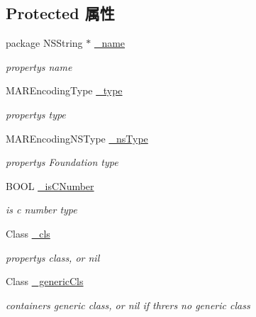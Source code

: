 \subsection*{Protected 属性}
\begin{DoxyCompactItemize}
\item 
package N\+S\+String $\ast$ \hyperlink{interface___m_a_r_model_property_meta_a4ef06b9ccb8efbf3795ec3398fba62ca}{\+\_\+name}
\begin{DoxyCompactList}\small\item\em property\textquotesingle{}s name \end{DoxyCompactList}\item 
M\+A\+R\+Encoding\+Type \hyperlink{interface___m_a_r_model_property_meta_aa15f92eb57f1786ae86186e09105a63b}{\+\_\+type}
\begin{DoxyCompactList}\small\item\em property\textquotesingle{}s type \end{DoxyCompactList}\item 
M\+A\+R\+Encoding\+N\+S\+Type \hyperlink{interface___m_a_r_model_property_meta_ab35b89e2e710e8b17714d708f60860f6}{\+\_\+ns\+Type}
\begin{DoxyCompactList}\small\item\em property\textquotesingle{}s Foundation type \end{DoxyCompactList}\item 
B\+O\+OL \hyperlink{interface___m_a_r_model_property_meta_affcc73f9311185f293b8b693d685aec0}{\+\_\+is\+C\+Number}
\begin{DoxyCompactList}\small\item\em is c number type \end{DoxyCompactList}\item 
Class \hyperlink{interface___m_a_r_model_property_meta_a6d3692d93d3afa41bf9e2a41809e1f02}{\+\_\+cls}
\begin{DoxyCompactList}\small\item\em property\textquotesingle{}s class, or nil \end{DoxyCompactList}\item 
Class \hyperlink{interface___m_a_r_model_property_meta_ad5b4b19b5c5cb6f90c7cbe004c503260}{\+\_\+generic\+Cls}
\begin{DoxyCompactList}\small\item\em container\textquotesingle{}s generic class, or nil if threr\textquotesingle{}s no generic class \end{DoxyCompactList}\item 

\end{DoxyCompactItemize}
